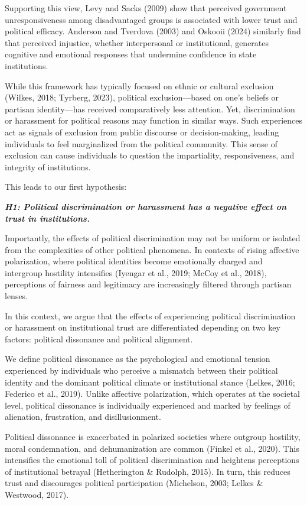 \documentclass{article}
\begin{document}
Supporting this view, Levy and Sacks (2009) show that perceived government unresponsiveness among disadvantaged groups is associated with lower trust and political efficacy. Anderson and Tverdova (2003) and Oskooii (2024) similarly find that perceived injustice, whether interpersonal or institutional, generates cognitive and emotional responses that undermine confidence in state institutions.

While this framework has typically focused on ethnic or cultural exclusion (Wilkes, 2018; Tyrberg, 2023), political exclusion—based on one's beliefs or partisan identity—has received comparatively less attention. Yet, discrimination or harassment for political reasons may function in similar ways. Such experiences act as signals of exclusion from public discourse or decision-making, leading individuals to feel marginalized from the political community. This sense of exclusion can cause individuals to question the impartiality, responsiveness, and integrity of institutions.

This leads to our first hypothesis:

\emph{\textbf{\small
H1: Political discrimination or harassment has a negative effect on trust in institutions.
}}

Importantly, the effects of political discrimination may not be uniform or isolated from the complexities of other political phenomena. In contexts of rising affective polarization, where political identities become emotionally charged and intergroup hostility intensifies (Iyengar et al., 2019; McCoy et al., 2018), perceptions of fairness and legitimacy are increasingly filtered through partisan lenses.

In this context, we argue that the effects of experiencing political discrimination or harassment on institutional trust are differentiated depending on two key factors: political dissonance and political alignment. 

We define political dissonance as the psychological and emotional tension experienced by individuals who perceive a mismatch between their political identity and the dominant political climate or institutional stance (Lelkes, 2016; Federico et al., 2019). Unlike affective polarization, which operates at the societal level, political dissonance is individually experienced and marked by feelings of alienation, frustration, and disillusionment.

Political dissonance is exacerbated in polarized societies where outgroup hostility, moral condemnation, and dehumanization are common (Finkel et al., 2020). This intensifies the emotional toll of political discrimination and heightens perceptions of institutional betrayal (Hetherington \& Rudolph, 2015). In turn, this reduces trust and discourages political participation (Michelson, 2003; Lelkes \& Westwood, 2017).
\end{document}
